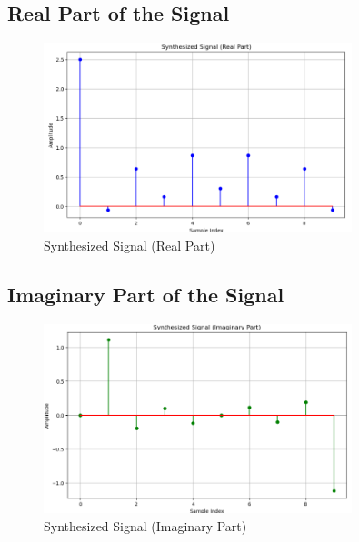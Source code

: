 \documentclass[12pt]{article}
\begin{document}
\subsection{Real Part of the Signal}

\begin{figure}[htbp]
    \centering
    \includegraphics[width=0.8\textwidth]{1.png}
    \caption{Synthesized Signal (Real Part)}
    \label{fig:real_part}

\end{figure}
\newpage
\vfill
\subsection{Imaginary Part of the Signal}
\begin{figure}[htbp]
    \centering
    \includegraphics[width=0.8\textwidth]{2.png}
    \caption{Synthesized Signal (Imaginary Part)}
    \label{fig:imaginary_part}
\end{figure}

\FloatBarrier
\vfill
\newpage
\end{document}
